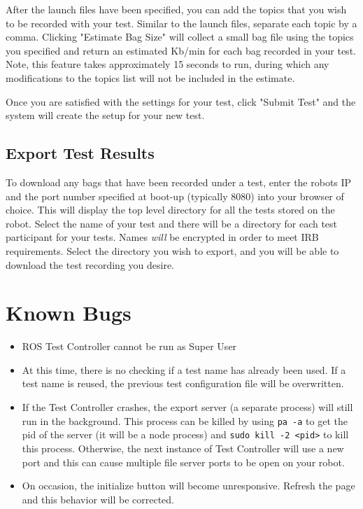 \documentclass[onecolumn, draftclsnofoot,10pt, compsoc]{report}
\begin{document}
After the launch files have been specified, you can add the topics that you wish to be recorded with your test. Similar to the launch files, separate each topic by a comma. Clicking "Estimate Bag Size" will collect a small bag file using the topics you specified and return an estimated Kb/min for each bag recorded in your test. Note, this feature takes approximately 15 seconds to run, during which any modifications to the topics list will not be included in the estimate. 

Once you are satisfied with the settings for your test, click "Submit Test" and the system will create the setup for your new test. 

\subsection{Export Test Results}
To download any bags that have been recorded under a test, enter the robots IP and the port number specified at boot-up (typically 8080) into your browser of choice. This will display the top level directory for all the tests stored on the robot. Select the name of your test and there will be a directory for each test participant for your tests. Names \textit{will} be encrypted in order to meet IRB requirements. Select the directory you wish to export, and you will be able to download the test recording you desire.

\section{Known Bugs}

\begin{itemize}
	\item ROS Test Controller cannot be run as Super User

	\item At this time, there is no checking if a test name has already been used. If a test name is reused, the previous test configuration file will be overwritten.

	\item If the Test Controller crashes, the export server (a separate process) will still run in the background. This process can be killed by using \texttt{pa -a} to get the pid of the server (it will be a node process) and \texttt{sudo kill -2 <pid>} to kill this process. Otherwise, the next instance of Test Controller will use a new port and this can cause multiple file server ports to be open on your robot.

	\item On occasion, the initialize button will become unresponsive. Refresh the page and this behavior will be corrected.
\end{itemize}
\end{document}
